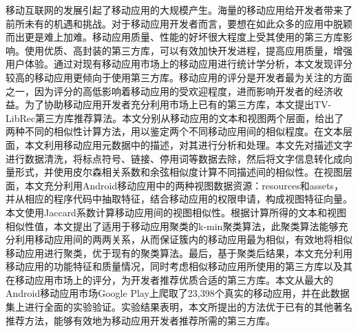 移动互联网的发展引起了移动应用的大规模产生。海量的移动应用给开发者带来了前所未有的机遇和挑战。对于移动应用开发者而言，要想在如此众多的应用中脱颖而出更是难上加难。移动应用质量、性能的好坏很大程度上受其使用的第三方库影响。使用优质、高封装的第三方库，可以有效加快开发进程，提高应用质量，增强用户体验。通过对现有移动应用市场上的移动应用进行统计学分析，本文发现评分较高的移动应用更倾向于使用第三方库。移动应用的评分是开发者最为关注的方面之一，因为评分的高低影响着移动应用的受欢迎程度，进而影响开发者的经济收益。为了协助移动应用开发者充分利用市场上已有的第三方库，本文提出TV-LibRec第三方库推荐算法。本文分别从移动应用的文本和视图两个层面，给出了两种不同的相似性计算方法，用以鉴定两个不同移动应用间的相似程度。在文本层面，本文利用移动应用元数据中的描述，对其进行分析和处理。本文先对描述文字进行数据清洗，将标点符号、链接、停用词等数据去除，然后将文字信息转化成向量形式，并使用皮尔森相关系数和余弦相似度计算不同描述间的相似性。在视图层面，本文充分利用Android移动应用中的两种视图数据资源：resources和assets，并从相应的程序代码中抽取特征，结合移动应用的权限申请，构成视图特征向量。本文使用Jaccard系数计算移动应用间的视图相似性。根据计算所得的文本和视图相似性值，本文提出了适用于移动应用聚类的k-min聚类算法，此聚类算法能够充分利用移动应用间的两两关系，从而保证簇内的移动应用最为相似，有效地将相似移动应用进行聚类，优于现有的聚类算法。最后，基于聚类后结果，本文充分利用移动应用的功能特征和质量情况，同时考虑相似移动应用所使用的第三方库以及其在移动应用市场上的评分，为开发者推荐优质合适的第三方库。本文从最大的Android移动应用市场Google Play上爬取了23,398个真实的移动应用，并在此数据集上进行全面的实验验证。实验结果表明，本文所提出的方法优于已有的其他著名推荐方法，能够有效地为移动应用开发者推荐所需的第三方库。